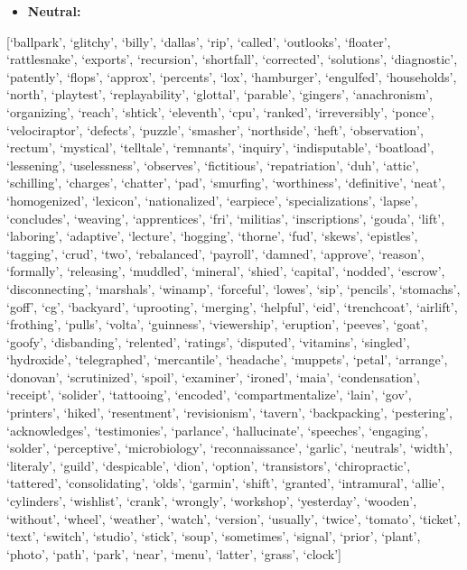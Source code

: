 \documentclass[
  10pt,
  dvipsnames,enabledeprecatedfontcommands]{scrartcl}
\providecommand{\tightlist}{%
  \setlength{\itemsep}{0pt}\setlength{\parskip}{0pt}}
\begin{document}
\begin{itemize}
\tightlist
\item
  \textbf{Neutral:}
\end{itemize}

{[}`ballpark', `glitchy', `billy', `dallas', `rip', `called',
`outlooks', `floater', `rattlesnake', `exports', `recursion',
`shortfall', `corrected', `solutions', `diagnostic', `patently',
`flops', `approx', `percents', `lox', `hamburger', `engulfed',
`households', `north', `playtest', `replayability', `glottal',
`parable', `gingers', `anachronism', `organizing', `reach', `shtick',
`eleventh', `cpu', `ranked', `irreversibly', `ponce', `velociraptor',
`defects', `puzzle', `smasher', `northside', `heft', `observation',
`rectum', `mystical', `telltale', `remnants', `inquiry', `indisputable',
`boatload', `lessening', `uselessness', `observes', `fictitious',
`repatriation', `duh', `attic', `schilling', `charges', `chatter',
`pad', `smurfing', `worthiness', `definitive', `neat', `homogenized',
`lexicon', `nationalized', `earpiece', `specializations', `lapse',
`concludes', `weaving', `apprentices', `fri', `militias',
`inscriptions', `gouda', `lift', `laboring', `adaptive', `lecture',
`hogging', `thorne', `fud', `skews', `epistles', `tagging', `crud',
`two', `rebalanced', `payroll', `damned', `approve', `reason',
`formally', `releasing', `muddled', `mineral', `shied', `capital',
`nodded', `escrow', `disconnecting', `marshals', `winamp', `forceful',
`lowes', `sip', `pencils', `stomachs', `goff', `cg', `backyard',
`uprooting', `merging', `helpful', `eid', `trenchcoat', `airlift',
`frothing', `pulls', `volta', `guinness', `viewership', `eruption',
`peeves', `goat', `goofy', `disbanding', `relented', `ratings',
`disputed', `vitamins', `singled', `hydroxide', `telegraphed',
`mercantile', `headache', `muppets', `petal', `arrange', `donovan',
`scrutinized', `spoil', `examiner', `ironed', `maia', `condensation',
`receipt', `solider', `tattooing', `encoded', `compartmentalize',
`lain', `gov', `printers', `hiked', `resentment', `revisionism',
`tavern', `backpacking', `pestering', `acknowledges', `testimonies',
`parlance', `hallucinate', `speeches', `engaging', `solder',
`perceptive', `microbiology', `reconnaissance', `garlic', `neutrals',
`width', `literaly', `guild', `despicable', `dion', `option',
`transistors', `chiropractic', `tattered', `consolidating', `olds',
`garmin', `shift', `granted', `intramural', `allie', `cylinders',
`wishlist', `crank', `wrongly', `workshop', `yesterday', `wooden',
`without', `wheel', `weather', `watch', `version', `usually', `twice',
`tomato', `ticket', `text', `switch', `studio', `stick', `soup',
`sometimes', `signal', `prior', `plant', `photo', `path', `park',
`near', `menu', `latter', `grass', `clock'{]}
\end{document}
